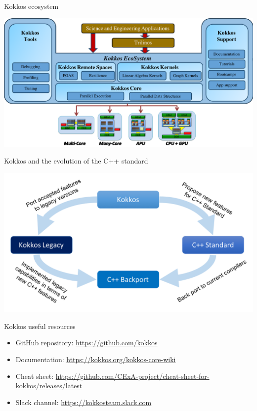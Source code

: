 \documentclass[aspectratio=169]{beamer}
\begin{document}

\begin{frame}{Kokkos ecosystem}
    \begin{center}
        \includegraphics[width=\textwidth]{kokkos-ecosystem.png}
    \end{center}
\end{frame}


\begin{frame}{Kokkos and the evolution of the C++ standard}
    \begin{center}
        \includegraphics[width=\textwidth]{kokkos-cpp-standard.png}
    \end{center}
\end{frame}


\begin{frame}{Kokkos useful resources}
    \begin{itemize}
        \item GitHub repository: \url{https://github.com/kokkos}
        \item Documentation: \url{https://kokkos.org/kokkos-core-wiki}
        \item Cheat sheet: \url{https://github.com/CExA-project/cheat-sheet-for-kokkos/releases/latest}
        \item Slack channel: \url{https://kokkosteam.slack.com}
    \end{itemize}
\end{frame}
\end{document}
